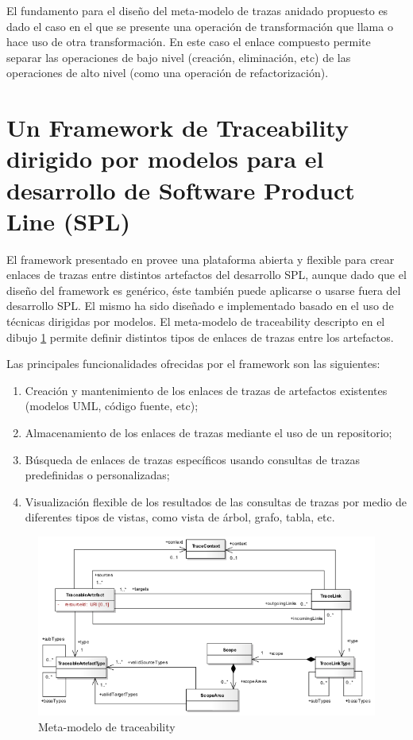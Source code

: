\documentclass[a4paper,12pt,oneside]{book}
\begin{document}
El fundamento para el diseño del meta-modelo de trazas anidado propuesto es dado el caso en el que se presente una operación de transformación que llama o hace uso de otra transformación. En este caso el enlace compuesto permite separar las operaciones de bajo nivel (creación, eliminación, etc) de las operaciones de alto nivel (como una operación de refactorización).

\section{Un Framework  de Traceability dirigido por modelos para el desarrollo de Software Product Line (SPL)}

El framework presentado en \cite{SousaKuleszaRummlerAnquetilMitschkeMoreiraAmaralAraujo}  provee una plataforma abierta y flexible para crear enlaces de trazas entre distintos artefactos del desarrollo SPL, aunque dado que el diseño del framework es genérico, éste también puede aplicarse o usarse fuera del desarrollo SPL. El mismo ha sido diseñado e implementado basado en el uso de técnicas dirigidas por modelos. El meta-modelo de traceability descripto en el dibujo \ref{fig:SPLMeta-modelo} permite definir distintos tipos de enlaces de trazas entre los artefactos.

Las principales funcionalidades ofrecidas por el framework son las siguientes:

\begin{enumerate}
\item     Creación y mantenimiento de los enlaces de trazas de artefactos existentes (modelos UML, código fuente, etc);
\item    Almacenamiento de los enlaces de trazas mediante el uso de un repositorio;
\item    Búsqueda de enlaces de trazas específicos usando consultas de trazas predefinidas o personalizadas;
\item    Visualización flexible de los resultados de las consultas de trazas por medio de diferentes tipos de vistas, como vista de árbol, grafo, tabla, etc.
\end{enumerate}

\begin{figure}[hbtp]
\centering
\includegraphics[scale=.6]{./img/Traceability_Metamodel}
\caption{Meta-modelo de traceability}
\label{fig:SPLMeta-modelo}
\end{figure}
\end{document}
